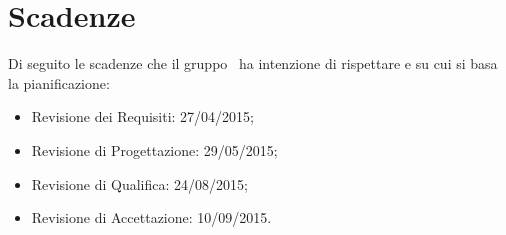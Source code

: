 \section{Scadenze}{
\label{sec:scadenze}
Di seguito le scadenze che il gruppo \gruppo\ ha intenzione di rispettare e su cui si basa la pianificazione:
\begin{itemize}
	\item Revisione dei Requisiti: 27/04/2015;
	\item Revisione di Progettazione: 29/05/2015;
	\item Revisione di Qualifica: 24/08/2015;
	\item Revisione di Accettazione: 10/09/2015.
\end{itemize}
}